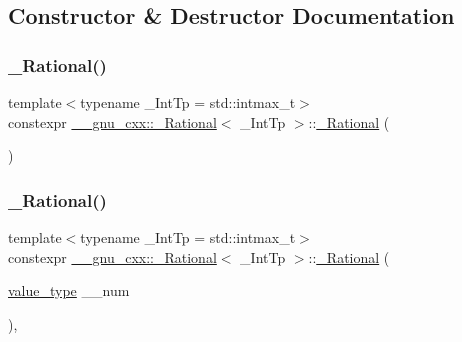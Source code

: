 \subsection{Constructor \& Destructor Documentation}
\mbox{\label{class____gnu__cxx_1_1__Rational_ae16e40bc052c32219ce5f11d25852d82}} 
\subsubsection{\texorpdfstring{\+\_\+\+Rational()}{\_Rational()}\hspace{0.1cm}{\footnotesize\ttfamily [1/4]}}
{\footnotesize\ttfamily template$<$typename \+\_\+\+Int\+Tp = std\+::intmax\+\_\+t$>$ \\
constexpr \hyperlink{class____gnu__cxx_1_1__Rational}{\+\_\+\+\_\+gnu\+\_\+cxx\+::\+\_\+\+Rational}$<$ \+\_\+\+Int\+Tp $>$\+::\hyperlink{class____gnu__cxx_1_1__Rational}{\+\_\+\+Rational} (\begin{DoxyParamCaption}{ }\end{DoxyParamCaption})\hspace{0.3cm}{\ttfamily [inline]}}

\mbox{\label{class____gnu__cxx_1_1__Rational_affaa840cee79783e14bd0a49ce59a356}} 
\subsubsection{\texorpdfstring{\+\_\+\+Rational()}{\_Rational()}\hspace{0.1cm}{\footnotesize\ttfamily [2/4]}}
{\footnotesize\ttfamily template$<$typename \+\_\+\+Int\+Tp = std\+::intmax\+\_\+t$>$ \\
constexpr \hyperlink{class____gnu__cxx_1_1__Rational}{\+\_\+\+\_\+gnu\+\_\+cxx\+::\+\_\+\+Rational}$<$ \+\_\+\+Int\+Tp $>$\+::\hyperlink{class____gnu__cxx_1_1__Rational}{\+\_\+\+Rational} (\begin{DoxyParamCaption}\item[{\hyperlink{class____gnu__cxx_1_1__Rational_a7987be70fc59d0d980621fd65828b74a}{value\+\_\+type}}]{\+\_\+\+\_\+num }\end{DoxyParamCaption})\hspace{0.3cm}{\ttfamily [inline]}, {\ttfamily [explicit]}}

